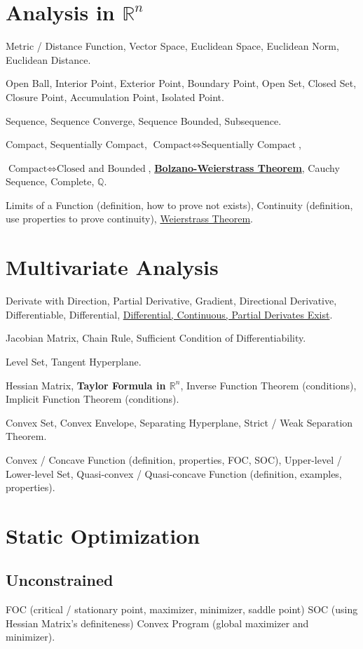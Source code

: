\section{Analysis in $\mathbb{R}^{n}$}

Metric / Distance Function, Vector Space, Euclidean Space, Euclidean Norm, Euclidean Distance.

Open Ball, Interior Point, Exterior Point, Boundary Point, Open Set, Closed Set, Closure Point, Accumulation Point, Isolated Point.

Sequence, Sequence Converge, Sequence Bounded, Subsequence.

Compact, Sequentially Compact, \underline{$\text{Compact} \iff \text{Sequentially Compact}$}, 

\underline{$\text{Compact} \iff \text{Closed and Bounded}$}, \underline{\textbf{Bolzano-Weierstrass Theorem}}, Cauchy Sequence, Complete, \underline{$\mathbb{Q}$}.

Limits of a Function (definition, how to prove not exists), Continuity (definition, use properties to prove continuity), \underline{Weierstrass Theorem}.

\section{Multivariate Analysis}

Derivate with Direction, Partial Derivative, Gradient, Directional Derivative, Differentiable, Differential, \underline{Differential, Continuous, Partial Derivates Exist}.

Jacobian Matrix, Chain Rule, Sufficient Condition of Differentiability.

Level Set, Tangent Hyperplane.

Hessian Matrix, \textbf{Taylor Formula in $\mathbb{R}^{n}$}, Inverse Function Theorem (conditions), Implicit Function Theorem (conditions).

Convex Set, Convex Envelope, Separating Hyperplane, Strict / Weak Separation Theorem.

Convex / Concave Function (definition, properties, FOC, SOC), Upper-level / Lower-level Set, Quasi-convex / Quasi-concave Function (definition, examples, properties).


\section{Static Optimization}

\subsection{Unconstrained}
FOC (critical / stationary point, maximizer, minimizer, saddle point)
SOC (using Hessian Matrix's definiteness)
Convex Program (global maximizer and minimizer).

